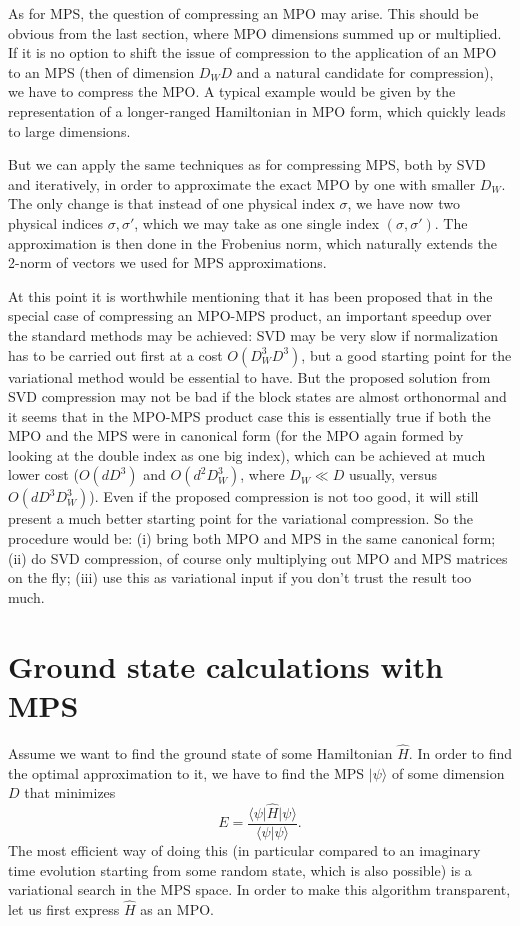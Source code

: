 \documentclass[a4paper,10pt,oneside,onecolumn,1p,times]{elsarticle}
\newcommand{\bra}[1]{\mbox{$\langle #1  |$}}
\newcommand{\ket}[1]{\mbox{$| #1  \rangle$}}
\newcommand{\braket}[2]{\mbox{$\langle #1  | #2 \rangle$}} 	%
\begin{document}
As for MPS, the question of compressing an MPO may arise. This should be obvious from the last section, where MPO dimensions summed up or multiplied. If it is no option to shift the issue of compression to the application of an MPO to an MPS (then of dimension $D_W D$ and a natural candidate for compression), we have to compress the MPO. A typical example would be given by the representation of a longer-ranged Hamiltonian in MPO form, which quickly leads to large dimensions.

But we can apply the same techniques as for compressing MPS, both by SVD and iteratively, in order to approximate the exact MPO by one with smaller $D_W$. The only change is that instead of one physical index $\sigma$, we have now two physical indices $\sigma,\sigma'$, which we may take as one single index $(\sigma,\sigma')$. The approximation is then done in the Frobenius norm, which naturally extends the 2-norm of vectors we used for MPS approximations.

At this point it is worthwhile mentioning that it has been proposed \cite{Stoudenmire10} that in the special case of compressing an MPO-MPS product, an important speedup over the standard methods may be achieved: SVD may be very slow if normalization has to be carried out first at a cost $O(D_W^3 D^3)$, but a good starting point for the variational method would be essential to have. But the proposed solution from SVD compression may not be bad if the block states are almost orthonormal and it seems that in the MPO-MPS product case this is essentially true if both the MPO and the MPS were in canonical form (for the MPO again formed by looking at the double index as one big index), which can be achieved at much lower cost ($O(d D^3)$ and $O(d^2 D_W^3)$, where $D_W \ll D$ usually, versus $O(d D^3 D_W^3)$). Even if the proposed compression is not too good, it will still present a much better starting point for the variational compression. So the procedure would be: (i) bring both MPO and MPS in the same canonical form; (ii) do SVD compression, of course only multiplying out MPO and MPS matrices on the fly; (iii) use this as variational input if you don't trust the result too much. 


 
\section{Ground state calculations with MPS}
\label{sec:groundstates}
Assume we want to find the ground state of some Hamiltonian $\hat{H}$.  In order to find the optimal approximation to it, we have to find the MPS $\ket{\psi}$ of some dimension $D$ that minimizes
\begin{equation}
E = \frac{\bra{\psi} \hat{H} \ket{\psi}}{\braket{\psi}{\psi}} .
\end{equation} 
The most efficient way of doing this (in particular compared to an imaginary time evolution starting from some random state, which is also possible) is a variational search in the MPS space. In order to make this algorithm transparent, let us first express $\hat{H}$ as an MPO.
\end{document}
